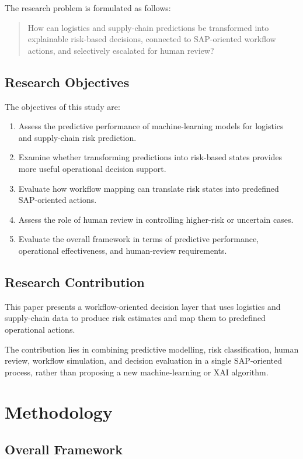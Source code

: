 \documentclass[manuscript, screen, review]{acmart}
\begin{document}
The research problem is formulated as follows:

\begin{quote}
How can logistics and supply-chain predictions be transformed into explainable risk-based decisions, connected to SAP-oriented workflow actions, and selectively escalated for human review?
\end{quote}

\subsection{Research Objectives}

The objectives of this study are:

\begin{enumerate}
\item Assess the predictive performance of machine-learning models for logistics and supply-chain risk prediction.
\item Examine whether transforming predictions into risk-based states provides more useful operational decision support.
\item Evaluate how workflow mapping can translate risk states into predefined SAP-oriented actions.
\item Assess the role of human review in controlling higher-risk or uncertain cases.
\item Evaluate the overall framework in terms of predictive performance, operational effectiveness, and human-review requirements.
\end{enumerate}


\subsection{Research Contribution}

This paper presents a workflow-oriented decision layer that uses
logistics and supply-chain data to produce risk estimates and map them
to predefined operational actions.

The contribution lies in combining predictive modelling, risk
classification, human review, workflow simulation, and decision
evaluation in a single SAP-oriented process, rather than proposing a
new machine-learning or XAI algorithm.

\section{Methodology}

\subsection{Overall Framework}
\end{document}
